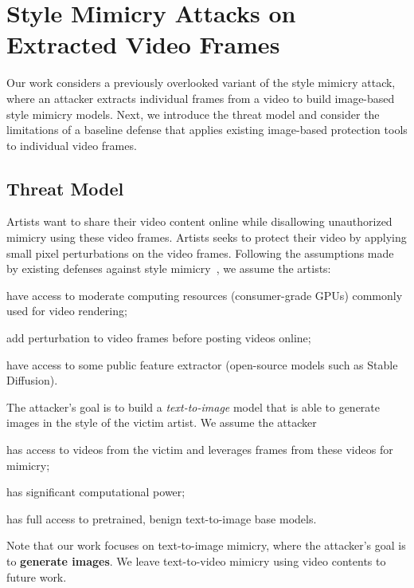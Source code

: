 \secspace
\section{Style Mimicry Attacks on Extracted Video Frames}
\label{sec:threat}

Our work considers a previously overlooked variant of the style mimicry
attack, where an attacker extracts individual frames from a video to build
image-based style mimicry models. Next, we introduce the threat model and
consider the limitations of a baseline defense that applies existing
image-based protection tools to individual video frames.

\secspace
\subsection{Threat Model}

 Artists want to share their video 
content online while disallowing unauthorized mimicry using these video frames. 
Artists seeks to protect their video by applying small 
pixel perturbations on the video frames. Following the assumptions made by existing defenses against style mimicry~\cite{shan2023glaze}, we
assume the artists: 
\begin{packed_itemize} 
    \item have access to moderate computing resources (\eg consumer-grade GPUs) commonly used for video rendering; 
    \item add perturbation to video frames before posting videos online; 
    \item have access to some public feature extractor (\eg open-source models such as Stable Diffusion).
\end{packed_itemize}

 The attacker's goal is to build a \textit{text-to-image} model
that is able to generate images in the style of the victim artist. We assume the 
attacker 
\begin{packed_itemize} 
\item has access to videos from the victim and leverages frames from
these videos for mimicry; 
\item has significant computational power; 
\item has full access to pretrained, benign text-to-image base models. 
\end{packed_itemize}
Note that our work focuses on text-to-image mimicry, where the attacker's goal
is to {\bf generate images}. We leave text-to-video 
mimicry using video contents to future work. 

